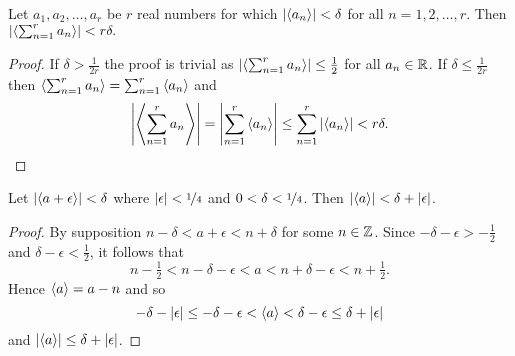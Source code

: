 \documentclass[journal]{IEEEtran}
\begin{document}
 \begin{lemma} \label{lem:fracpartsumanddelta}
 Let $a_1, a_2, \dots, a_r$ be $r$ real numbers for which $\left|\left\langle a_n \right\rangle\right| < \delta$ for all $n = 1,2,\dots,r$.  Then $\left|\left\langle \sum_{n=1}^r{a_n} \right\rangle\right| < r\delta.$
 \end{lemma}
 \begin{proof}
 If $\delta > \tfrac{1}{2r}$ the proof is trivial as $\left|\left\langle \sum_{n=1}^r{a_n} \right\rangle\right| \leq \tfrac{1}{2}$ for all $a_n \in {\mathbb R}$.  If $\delta \leq \tfrac{1}{2r}$ then $\left\langle \sum_{n=1}^r{a_n} \right\rangle = \sum_{n=1}^r{\left\langle a_n \right\rangle}$ and
 \[
 \left\vert\left\langle \sum_{n=1}^r{a_n} \right\rangle\right\vert = \left\vert\sum_{n=1}^r{\left\langle a_n \right\rangle}\right\vert \leq \sum_{n=1}^r{\left\vert\left\langle a_n \right\rangle\right\vert} < r\delta.
 \]
 \end{proof}


\begin{lemma} \label{lem:fracpartinternalsumlessdelta}
Let $\left|\left\langle a + \epsilon \right\rangle\right| < \delta$ where $|\epsilon| < \nicefrac{1}{4}$ and $0<\delta<\nicefrac{1}{4}$. Then $\left|\left\langle a \right\rangle\right| < \delta + |\epsilon|$.
\end{lemma}
\begin{proof}
By supposition $n - \delta < a + \epsilon < n + \delta$ for some $n \in {\mathbb Z}$.  Since $-\delta - \epsilon > -\tfrac{1}{2}$ and $\delta - \epsilon < \tfrac{1}{2}$, it follows that
\[
n - \tfrac{1}{2} < n - \delta - \epsilon < a < n + \delta - \epsilon < n + \tfrac{1}{2}.
\]
Hence $\left\langle a \right\rangle = a - n$ and so
\[
-\delta - \left\vert \epsilon \right\vert \leq -\delta - \epsilon < \left\langle a \right\rangle < \delta - \epsilon \leq \delta + \left\vert \epsilon \right\vert
\]
and $\left\vert \left\langle a \right\rangle \right\vert \leq \delta + \left\vert \epsilon \right\vert$.

\end{proof}
\end{document}
